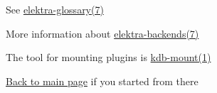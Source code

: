 \begin{DoxyItemize}
\item See \hyperlink{md_doc_help_elektra-glossary_doc_help_elektra-glossary_md}{elektra-\/glossary(7)}
\item More information about \hyperlink{md_doc_help_elektra-backends_doc_help_elektra-backends_md}{elektra-\/backends(7)}
\item The tool for mounting plugins is \hyperlink{md_doc_help_kdb-mount_doc_help_kdb-mount_md}{kdb-\/mount(1)}
\item \hyperlink{README_md}{Back to main page} if you started from there 
\end{DoxyItemize}